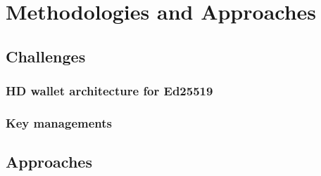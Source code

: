 \chapter{Methodologies and Approaches} \label{chap:Methodologies_and_Approaches}

\section{Challenges}

\subsection{HD wallet architecture for Ed25519}

\subsection{Key managements}

\section{Approaches}



